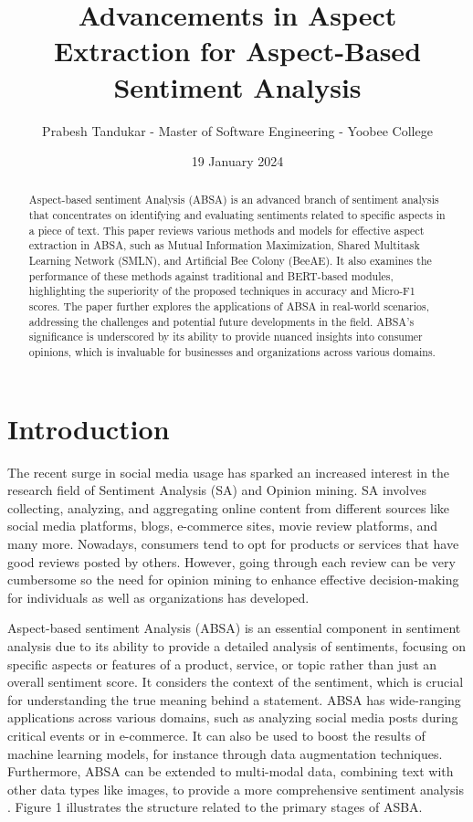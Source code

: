 \documentclass{article}
\title{Advancements in Aspect Extraction for Aspect-Based Sentiment Analysis}
\author{Prabesh Tandukar - Master of Software Engineering - Yoobee College}
\date{19 January 2024}
\begin{document}
\maketitle

\tableofcontents
\listoffigures
\listoftables

\newpage

\begin{abstract}
Aspect-based sentiment Analysis (ABSA) is an advanced branch of sentiment analysis that concentrates on identifying and evaluating sentiments related to specific aspects in a piece of text. This paper reviews various methods and models for effective aspect extraction in ABSA, such as Mutual Information Maximization, Shared Multitask Learning Network (SMLN), and Artificial Bee Colony (BeeAE). It also examines the performance of these methods against traditional and BERT-based modules, highlighting the superiority of the proposed techniques in accuracy and Micro-F1 scores. The paper further explores the applications of ABSA in real-world scenarios, addressing the challenges and potential future developments in the field. ABSA's significance is underscored by its ability to provide nuanced insights into consumer opinions, which is invaluable for businesses and organizations across various domains.
\end{abstract}

\section{Introduction}
The recent surge in social media usage has sparked an increased interest in the research field of Sentiment Analysis (SA) and Opinion mining. SA involves collecting, analyzing, and aggregating online content from different sources like social media platforms, blogs, e-commerce sites, movie review platforms, and many more. Nowadays, consumers tend to opt for products or services that have good reviews posted by others. However, going through each review can be very cumbersome so the need for opinion mining to enhance effective decision-making for individuals as well as organizations has developed.\cite{ansari2020aspect} 

Aspect-based sentiment Analysis (ABSA) is an essential component in sentiment analysis due to its ability to provide a detailed analysis of sentiments, focusing on specific aspects or features of a product, service, or topic rather than just an overall sentiment score. It considers the context of the sentiment, which is crucial for understanding the true meaning behind a statement. ABSA has wide-ranging applications across various domains, such as analyzing social media posts during critical events or in e-commerce. It can also be used to boost the results of machine learning models, for instance through data augmentation techniques. Furthermore, ABSA can be extended to multi-modal data, combining text with other data types like images, to provide a more comprehensive sentiment analysis\cite{Jiang2023AspectBasedSA}\cite{Gomes2023GABSAPTGN} \cite{lvarezLpez2018APF} \cite{Bensoltane2021ComparingWE} \cite{zhao2023m2df}. Figure 1 illustrates the structure related to the primary stages of ASBA.
\end{document}
